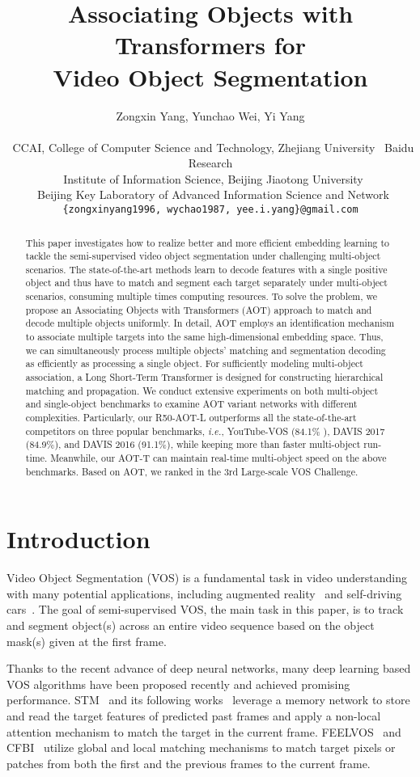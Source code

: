 \documentclass{article}
\title{Associating Objects with Transformers for \\ Video Object Segmentation}
\author{Zongxin Yang, Yunchao Wei, Yi Yang \\
  \\
  ~CCAI, College of Computer Science and Technology, Zhejiang University \hspace{1mm}~Baidu Research\\
  ~Institute of Information Science, Beijing Jiaotong University \\
  ~Beijing Key Laboratory of Advanced Information Science and Network \\
  \texttt{\{zongxinyang1996, wychao1987, yee.i.yang\}@gmail.com} \\
}
\def\ie{\emph{i.e.}}
\begin{document}
\maketitle

\begin{abstract}
This paper investigates how to realize better and more efficient embedding learning to tackle the semi-supervised video object segmentation under challenging multi-object scenarios. The state-of-the-art methods learn to decode features with a single positive object and thus have to match and segment each target separately under multi-object scenarios, consuming multiple times computing resources. To solve the problem, we propose an Associating Objects with Transformers (AOT) approach to match and decode multiple objects uniformly. In detail, AOT employs an identification mechanism to associate multiple targets into the same high-dimensional embedding space. Thus, we can simultaneously process multiple objects' matching and segmentation decoding as efficiently as processing a single object. For sufficiently modeling multi-object association, a Long Short-Term Transformer is designed for constructing hierarchical matching and propagation. We conduct extensive experiments on both multi-object and single-object benchmarks to examine AOT variant networks with different complexities. Particularly, our R50-AOT-L outperforms all the state-of-the-art competitors on three popular benchmarks, \ie, YouTube-VOS (84.1\% ), DAVIS 2017 (84.9\%), and DAVIS 2016 (91.1\%), while keeping more than  faster multi-object run-time. Meanwhile, our AOT-T can maintain real-time multi-object speed on the above benchmarks. Based on AOT, we ranked  in the 3rd Large-scale VOS Challenge.
\end{abstract} 
\section{Introduction}\label{sec:introduction}
Video Object Segmentation (VOS) is a fundamental task in video understanding with many potential applications, including augmented reality~\cite{ngan2011video} and self-driving cars~\cite{zhang2016instance}. The goal of semi-supervised VOS, the main task in this paper, is to track and segment object(s) across an entire video sequence based on the object mask(s) given at the first frame.

Thanks to the recent advance of deep neural networks, many deep learning based VOS algorithms have been proposed recently and achieved promising performance. STM~\cite{spacetime} and its following works~\cite{KMN,EGMN} leverage a memory network to store and read the target features of predicted past frames and apply a non-local attention mechanism to match the target in the current frame. FEELVOS~\cite{feelvos} and CFBI~\cite{cfbi,cfbip} utilize global and local matching mechanisms to match target pixels or patches from both the first and the previous frames to the current frame.
\end{document}
